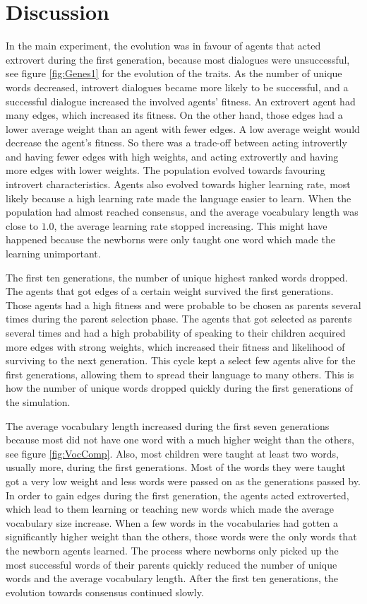 \acresetall
\chapter{Discussion}\label{ch:Chapter6}
In the main experiment, the evolution was in favour of agents that acted extrovert during the first generation, because most dialogues were unsuccessful, see figure \ref{fig:Genes1} for the evolution of the traits. As the number of unique words decreased, introvert dialogues became more likely to be successful, and a successful dialogue increased the involved agents' fitness. An extrovert agent had many edges, which increased its fitness. On the other hand, those edges had a lower average weight than an agent with fewer edges. A low average weight would decrease the agent's fitness. So there was a trade-off between acting introvertly and having fewer edges with high weights, and acting extrovertly and having more edges with lower weights. The population evolved towards favouring introvert characteristics. Agents also evolved towards higher learning rate, most likely because a high learning rate made the language easier to learn. When the population had almost reached consensus, and the average vocabulary length was close to $1.0$, the average learning rate stopped increasing. This might have happened because the newborns were only taught one word which made the learning unimportant. 

The first ten generations, the number of unique highest ranked words dropped. The agents that got edges of a certain weight survived the first generations. Those agents had a high fitness and were probable to be chosen as parents several times during the parent selection phase. The agents that got selected as parents several times and had a high probability of speaking to their children acquired more edges with strong weights, which increased their fitness and likelihood of surviving to the next generation. This cycle kept a select few agents alive for the first generations, allowing them to spread their language to many others. This is how the number of unique words dropped quickly during the first generations of the simulation. 

The average vocabulary length increased during the first seven generations because most did not have one word with a much higher weight than the others, see figure \ref{fig:VocComp}. Also, most children were taught at least two words, usually more, during the first generations. Most of the words they were taught got a very low weight and less words were passed on as the generations passed by. In order to gain edges during the first generation, the agents acted extroverted, which lead to them learning or teaching new words which made the average vocabulary size increase. When a few words in the vocabularies had gotten a significantly higher weight than the others, those words were the only words that the newborn agents learned. The process where newborns only picked up the most successful words of their parents quickly reduced the number of unique words and the average vocabulary length. After the first ten generations, the evolution towards consensus continued slowly. 
 
